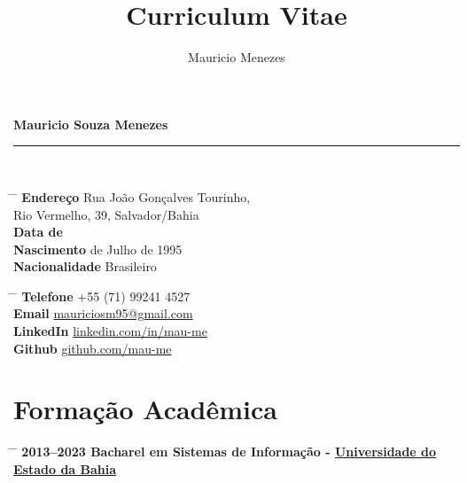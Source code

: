 \documentclass{article}
\title{Curriculum Vitae}
\author{Mauricio Menezes}
\begin{document}
{\huge{\color{slateblue}\textbf{Mauricio Souza Menezes}}}\\
\rule{\textwidth}{0.5mm}\\


\parbox{0.5\textwidth}{
	\begin{tabbing}
		\hspace{3cm} \= \hspace{4cm} \= \kill
		{\bf Endereço} \> Rua João Gonçalves Tourinho, \\
		\> Rio Vermelho, 39, Salvador/Bahia \\
		{\bf Data de } \\
		{\bf Nascimento}  de Julho de 1995 \\
		{\bf Nacionalidade} \> Brasileiro
	\end{tabbing}
}\hfil\parbox{0.5\textwidth}{
	\begin{tabbing}
		\hspace{3cm} \= \hspace{4cm} \= \kill
		{\bf Telefone} \> +55 (71) 99241 4527 \\
		{\bf Email} \> \href{mailto:mauriciosm95@gmail.com}{mauriciosm95@gmail.com} \\
		{\bf LinkedIn} \> \href{https://www.linkedin.com/in/mau-me/}{linkedin.com/in/mau-me} \\
		{\bf Github} \> \href{https://github.com/mau-me}{github.com/mau-me} \\
	\end{tabbing}
}





\section*{Formação Acadêmica}

\begin{tabbing}
	\hspace{2cm} \= \hspace{4cm} \= \kill
	\bf{2013--2023} \> Bacharel em Sistemas de Informação - \href{https://portal.uneb.br/}{Universidade do Estado da Bahia} \\
\end{tabbing}
\end{document}
